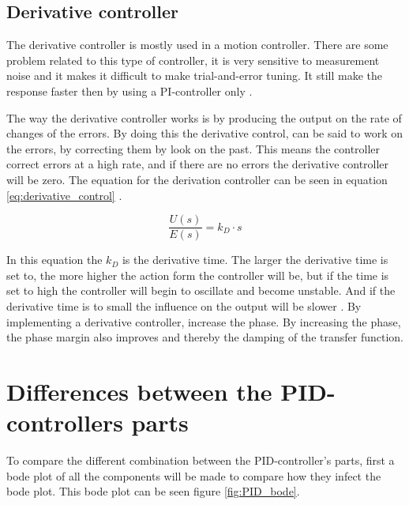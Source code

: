 \subsection*{Derivative controller}
The derivative controller is mostly used in a motion controller. There are some problem related to this type of controller, it is very sensitive to measurement noise and it makes it difficult to make trial-and-error tuning.  It still make the response faster then by using a PI-controller only \cite{digital_control}. 

The way the derivative controller works is by producing the output on the rate of changes of the errors. By doing this the derivative control, can be said to work on the errors, by correcting them by look on the past. This means the controller correct errors at a high rate, and if there are no errors the derivative controller will be zero. The equation for the derivation controller can be seen in equation \ref{eq:derivative_control} \cite{digital_control}.

\begin{equation}\label{eq:derivative_control}
\frac{U(s)}{E(s)}=k_D \cdot s
\end{equation}

In this equation the $k_D$ is the derivative time. The larger the derivative time is set to, the more higher the action form the controller will be, but if the time is set to high the controller will begin to oscillate and become unstable. And if the derivative time is to small the influence on the output will be slower \cite{digital_control}. By implementing a derivative controller, increase the phase. By increasing the phase, the phase margin also improves and thereby the damping of the transfer function.

\section{Differences between the PID-controllers parts}\label{s:different_pid}
To compare the different combination between the PID-controller's parts, first a bode plot of all the components will be made to compare how they infect the bode plot. This bode plot can be seen figure \ref{fig:PID_bode}.

